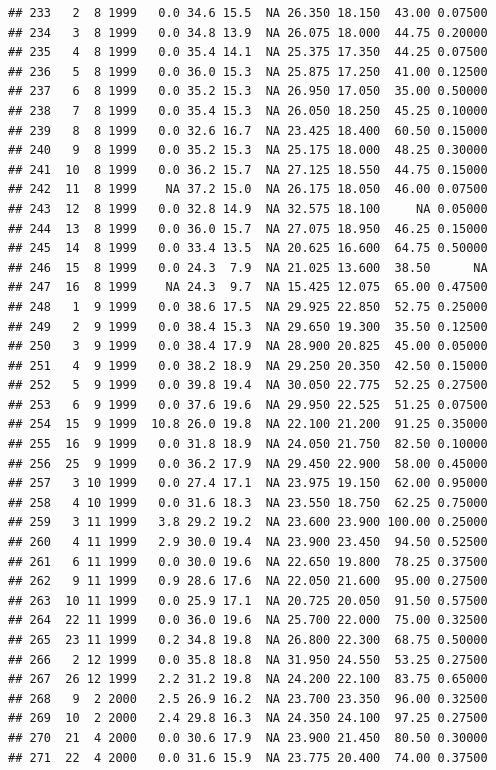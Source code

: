 \documentclass[
]{book}
\begin{document}
\begin{verbatim}
## 233   2  8 1999   0.0 34.6 15.5  NA 26.350 18.150  43.00 0.07500
## 234   3  8 1999   0.0 34.8 13.9  NA 26.075 18.000  44.75 0.20000
## 235   4  8 1999   0.0 35.4 14.1  NA 25.375 17.350  44.25 0.07500
## 236   5  8 1999   0.0 36.0 15.3  NA 25.875 17.250  41.00 0.12500
## 237   6  8 1999   0.0 35.2 15.3  NA 26.950 17.050  35.00 0.50000
## 238   7  8 1999   0.0 35.4 15.3  NA 26.050 18.250  45.25 0.10000
## 239   8  8 1999   0.0 32.6 16.7  NA 23.425 18.400  60.50 0.15000
## 240   9  8 1999   0.0 35.2 15.3  NA 25.175 18.000  48.25 0.30000
## 241  10  8 1999   0.0 36.2 15.7  NA 27.125 18.550  44.75 0.15000
## 242  11  8 1999    NA 37.2 15.0  NA 26.175 18.050  46.00 0.07500
## 243  12  8 1999   0.0 32.8 14.9  NA 32.575 18.100     NA 0.05000
## 244  13  8 1999   0.0 36.0 15.7  NA 27.075 18.950  46.25 0.15000
## 245  14  8 1999   0.0 33.4 13.5  NA 20.625 16.600  64.75 0.50000
## 246  15  8 1999   0.0 24.3  7.9  NA 21.025 13.600  38.50      NA
## 247  16  8 1999    NA 24.3  9.7  NA 15.425 12.075  65.00 0.47500
## 248   1  9 1999   0.0 38.6 17.5  NA 29.925 22.850  52.75 0.25000
## 249   2  9 1999   0.0 38.4 15.3  NA 29.650 19.300  35.50 0.12500
## 250   3  9 1999   0.0 38.4 17.9  NA 28.900 20.825  45.00 0.05000
## 251   4  9 1999   0.0 38.2 18.9  NA 29.250 20.350  42.50 0.15000
## 252   5  9 1999   0.0 39.8 19.4  NA 30.050 22.775  52.25 0.27500
## 253   6  9 1999   0.0 37.6 19.6  NA 29.950 22.525  51.25 0.07500
## 254  15  9 1999  10.8 26.0 19.8  NA 22.100 21.200  91.25 0.35000
## 255  16  9 1999   0.0 31.8 18.9  NA 24.050 21.750  82.50 0.10000
## 256  25  9 1999   0.0 36.2 17.9  NA 29.450 22.900  58.00 0.45000
## 257   3 10 1999   0.0 27.4 17.1  NA 23.975 19.150  62.00 0.95000
## 258   4 10 1999   0.0 31.6 18.3  NA 23.550 18.750  62.25 0.75000
## 259   3 11 1999   3.8 29.2 19.2  NA 23.600 23.900 100.00 0.25000
## 260   4 11 1999   2.9 30.0 19.4  NA 23.900 23.450  94.50 0.52500
## 261   6 11 1999   0.0 30.0 19.6  NA 22.650 19.800  78.25 0.37500
## 262   9 11 1999   0.9 28.6 17.6  NA 22.050 21.600  95.00 0.27500
## 263  10 11 1999   0.0 25.9 17.1  NA 20.725 20.050  91.50 0.57500
## 264  22 11 1999   0.0 36.0 19.6  NA 25.700 22.000  75.00 0.32500
## 265  23 11 1999   0.2 34.8 19.8  NA 26.800 22.300  68.75 0.50000
## 266   2 12 1999   0.0 35.8 18.8  NA 31.950 24.550  53.25 0.27500
## 267  26 12 1999   2.2 31.2 19.8  NA 24.200 22.100  83.75 0.65000
## 268   9  2 2000   2.5 26.9 16.2  NA 23.700 23.350  96.00 0.32500
## 269  10  2 2000   2.4 29.8 16.3  NA 24.350 24.100  97.25 0.27500
## 270  21  4 2000   0.0 30.6 17.9  NA 23.900 21.450  80.50 0.30000
## 271  22  4 2000   0.0 31.6 15.9  NA 23.775 20.400  74.00 0.37500

\end{verbatim}
\end{document}
